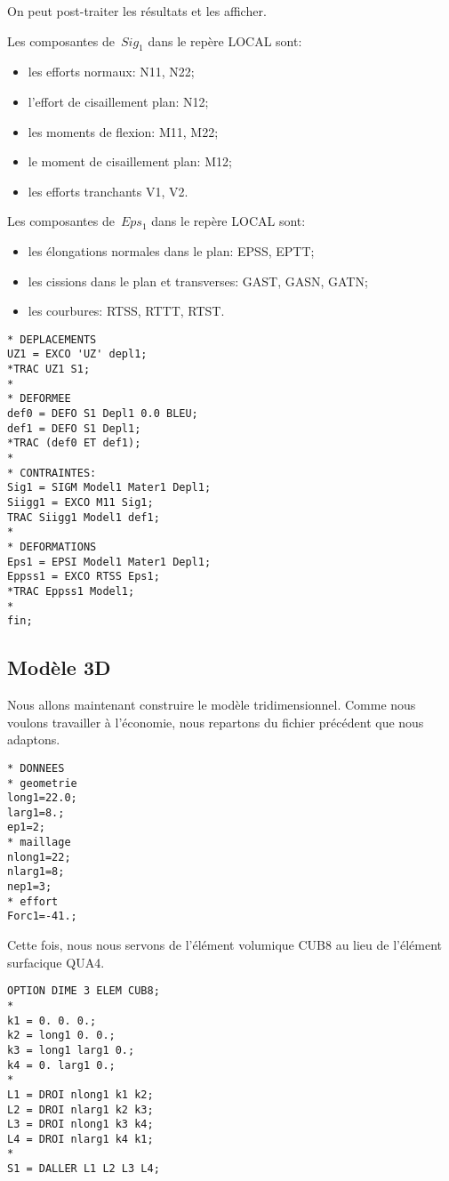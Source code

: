 On peut post-traiter les résultats et les afficher.

Les composantes de~$Sig_1$ dans le repère LOCAL sont:
\begin{itemize}
  \item les efforts normaux: N11, N22;
  \item l'effort de cisaillement plan: N12; 
  \item les moments de flexion: M11, M22;
  \item le moment de cisaillement plan: M12;
  \item les efforts tranchants V1, V2.
\end{itemize}

Les composantes de~$Eps_1$ dans le repère LOCAL sont:
\begin{itemize}
  \item les élongations normales dans le plan: EPSS, EPTT;
  \item les cissions dans le plan et transverses: GAST, GASN, GATN;
  \item les courbures: RTSS, RTTT, RTST.
\end{itemize}
\begin{lstlisting}[firstnumber=last]
* DEPLACEMENTS
UZ1 = EXCO 'UZ' depl1;
*TRAC UZ1 S1;
*
* DEFORMEE
def0 = DEFO S1 Depl1 0.0 BLEU;
def1 = DEFO S1 Depl1;
*TRAC (def0 ET def1);
*
* CONTRAINTES: 
Sig1 = SIGM Model1 Mater1 Depl1;
Siigg1 = EXCO M11 Sig1;
TRAC Siigg1 Model1 def1;
*
* DEFORMATIONS
Eps1 = EPSI Model1 Mater1 Depl1;
Eppss1 = EXCO RTSS Eps1;
*TRAC Eppss1 Model1;
*
fin;
\end{lstlisting}

\medskip
\subsection{Modèle 3D}

Nous allons maintenant construire le modèle tridimensionnel. Comme nous voulons travailler à l'économie, nous repartons du fichier précédent que nous adaptons.
\begin{lstlisting}[firstnumber=1]
* DONNEES
* geometrie
long1=22.0;
larg1=8.;
ep1=2;
* maillage
nlong1=22;
nlarg1=8;
nep1=3;
* effort
Forc1=-41.;
\end{lstlisting}

Cette fois, nous nous servons de l'élément volumique CUB8 au lieu de l'élément surfacique QUA4.
\begin{lstlisting}[firstnumber=last]
OPTION DIME 3 ELEM CUB8;
*
k1 = 0. 0. 0.;
k2 = long1 0. 0.;
k3 = long1 larg1 0.;
k4 = 0. larg1 0.;
*
L1 = DROI nlong1 k1 k2;
L2 = DROI nlarg1 k2 k3;
L3 = DROI nlong1 k3 k4;
L4 = DROI nlarg1 k4 k1;
*
S1 = DALLER L1 L2 L3 L4;
\end{lstlisting}


